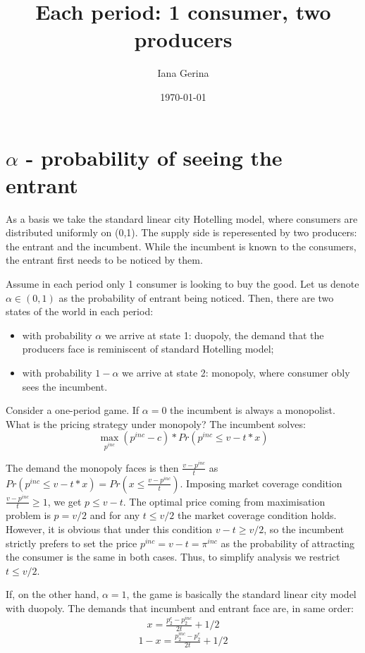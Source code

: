 \documentclass{article}
\title{Each period: 1 consumer, two producers}
\author{Iana Gerina}
\date{\today}
\begin{document}
\maketitle


\section{$\alpha$ - probability of seeing the entrant}

As a basis we take the standard linear city Hotelling model, where consumers are distributed uniformly on (0,1). The supply side is reperesented by two producers: the entrant and the incumbent. While the incumbent is known to the consumers, the entrant first needs to be noticed by them. 

Assume in each period only 1 consumer is looking to buy the good. Let us denote $\alpha \in (0,1)$ as the probability of entrant being noticed. Then, there are two states of the world in each period:

\begin{itemize}
    \item with probability $\alpha$ we arrive at state 1: duopoly, the demand that the producers face is reminiscent of standard Hotelling model;
    \item with probability $1-\alpha$ we arrive at state 2: monopoly, where consumer obly sees the incumbent.
\end{itemize}

Consider a one-period game. If $\alpha = 0$ the incumbent is always a monopolist. What is the pricing strategy under monopoly? The incumbent solves:
$$\max_{p^{inc}} (p^{inc}-c)* Pr(p^{inc}\leq v-t*x)$$

The demand the monopoly faces is then $\frac{v-p^{inc}}{t}$ as $Pr(p^{inc}\leq v-t*x) = Pr(x\leq \frac{v-p^{inc}}{t})$. Imposing market coverage condition $\frac{v-p^{inc}}{t} \geq  1$, we get $p \leq v-t$. The optimal price coming from maximisation problem is $p=v/2$ and for any $t \leq v/2$ the market coverage condition holds. However, it is obvious that under this condition $v-t \geq v/2$, so the incumbent strictly prefers to set the price $p^{inc} = v-t = \pi^{inc}$ as the probability of attracting the consumer is the same in both cases. Thus, to simplify analysis we restrict $t \leq v/2$. 

If, on the other hand, $\alpha=1$, the game is basically the standard linear city model with duopoly. The demands that incumbent and entrant face are, in same order:
$$ x =  \tfrac{p^{e}_2 - p^{inc}_2}{2t} + 1/2 $$
$$1-x = \tfrac{p^{inc}_2 - p^{e}_2}{2t} + 1/2$$
\end{document}
